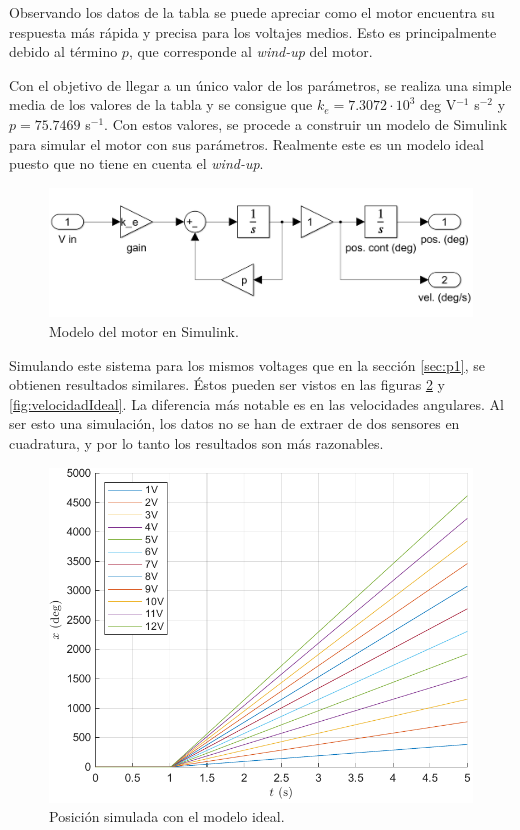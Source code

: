 \documentclass{article}
\begin{document}
Observando los datos de la tabla se puede apreciar como el motor encuentra su respuesta más rápida y precisa para los voltajes medios. Esto es principalmente debido al término $p$, que corresponde al \textit{wind-up} del motor.

Con el objetivo de llegar a un único valor de los parámetros, se realiza una simple media de los valores de la tabla y se consigue que $k_e = 7.3072\cdot10^3$ deg V$^{-1}$ s$^{-2}$ y $p = 75.7469$ s$^{-1}$. Con estos valores, se procede a construir un modelo de Simulink para simular el motor con sus parámetros. Realmente este es un modelo ideal puesto que no tiene en cuenta el \textit{wind-up}.

\begin{figure}[H]
    \centering
    \includegraphics[width=0.75\linewidth]{img/motorIdeal.png}
    \caption{Modelo del motor en Simulink.}
    \label{fig:motorIdeal}
\end{figure}

Simulando este sistema para los mismos voltages que en la sección \ref{sec:p1}, se obtienen resultados similares. Éstos pueden ser vistos en las figuras \ref{fig:posicionIdeal} y \ref{fig:velocidadIdeal}. La diferencia más notable es en las velocidades angulares. Al ser esto una simulación, los datos no se han de extraer de dos sensores en cuadratura, y por lo tanto los resultados son más razonables.

\begin{figure}[H]
    \centering
    \includegraphics[width=0.75\linewidth]{img/posicionIdeal.pdf}
    \caption{Posición simulada con el modelo ideal.}
    \label{fig:posicionIdeal}
\end{figure}
\end{document}
